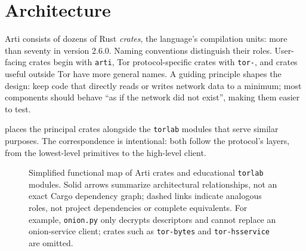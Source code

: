 \section{Architecture}\label{sec:arti-architettura}

Arti consists of dozens of Rust \emph{crates}, the language's compilation units: more than seventy in version 2.6.0. Naming conventions distinguish their roles. User-facing crates begin with \texttt{arti}, Tor protocol-specific crates with \texttt{tor-}, and crates useful outside Tor have more general names. A guiding principle shapes the design: keep code that directly reads or writes network data to a minimum; most components should behave \enquote{as if the network did not exist}, making them easier to test.

 places the principal crates alongside the \texttt{torlab} modules that serve similar purposes. The correspondence is intentional: both follow the protocol's layers, from the lowest-level primitives to the high-level client.

\begin{figure}[htbp]
\centering

\caption{Simplified functional map of Arti crates and educational \texttt{torlab} modules. Solid arrows summarize architectural relationships, not an exact Cargo dependency graph; dashed links indicate analogous roles, not project dependencies or complete equivalents. For example, \texttt{onion.py} only decrypts descriptors and cannot replace an onion-service client; crates such as \texttt{tor-bytes} and \texttt{tor-hsservice} are omitted.}
\label{fig:crate}
\end{figure}


